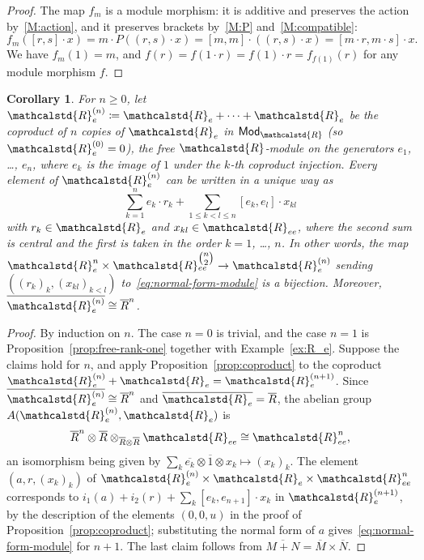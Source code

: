\documentclass[reqno,a4paper]{amsart}
\renewcommand{\binom}{\tbinom} %
\theoremstyle{plain}
\newtheorem{corollary}[subsection]{Corollary}
\theoremstyle{definition}
\newcommand{\DefEq}{\coloneq}
\newcommand{\R}{\ensuremath{\mathcalstd{R}}}
\newcommand{\Mod}{\ensuremath{\mathsf{Mod}}}
\renewcommand{\Re}{\ensuremath{\R_{e}}}
\newcommand{\Ree}{\ensuremath{\R_{ee}}}
\newcommand{\Rbar}{\ensuremath{\overline{R}}}
\newcommand{\brk}[2]{\ensuremath{[#1,#2]}}
\begin{document}
\begin{proof}
  The map \(f_{m}\) is a module morphism: it is additive and preserves the action by~\ref{M:action}, and it preserves brackets by~\ref{M:P} and~\ref{M:compatible}:
  \[
    f_{m}(\brk{r}{s}\cdot x)=m\cdot P((r,s)\cdot x)=\brk{m}{m}\cdot((r,s)\cdot x)=\brk{m\cdot r}{m\cdot s}\cdot x\text{.}
  \]
  We have \(f_{m}(1)=m\), and \(f(r)=f(1\cdot r)=f(1)\cdot r=f_{f(1)}(r)\) for any module morphism \(f\).
\end{proof}

\begin{corollary}\label{cor:free-modules}
  For \(n\geq 0\), let \(\Re^{(n)}\DefEq\Re+\cdots+\Re\) be the coproduct of \(n\) copies of \(\Re\) in \(\Mod_{\R}\) (so \(\Re^{(0)}=0\)), the free \(\R\)-module on the generators \(e_{1}\), \dots, \(e_{n}\), where \(e_{k}\) is the image of \(1\) under the \(k\)-th coproduct injection. Every element of \(\Re^{(n)}\) can be written in a unique way as
  \begin{equation}\label{eq:normal-form-module}
    \sum_{k=1}^{n}e_{k}\cdot r_{k}+\sum_{1\leq k<l\leq n}\brk{e_{k}}{e_{l}}\cdot x_{kl}
  \end{equation}
  with \(r_{k}\in\Re\) and \(x_{kl}\in\Ree\), where the second sum is central and the first is taken in the order \(k=1\), \dots, \(n\). In other words, the map \(\Re^{n}\times\Ree^{\binom{n}{2}}\to\Re^{(n)}\) sending \(((r_{k})_{k},(x_{kl})_{k<l})\) to~\eqref{eq:normal-form-module} is a bijection. Moreover, \(\overline{\Re^{(n)}}\cong\Rbar^{n}\).
\end{corollary}

\begin{proof}
  By induction on \(n\). The case \(n=0\) is trivial, and the case \(n=1\) is Proposition~\ref{prop:free-rank-one} together with Example~\ref{ex:R_e}. Suppose the claims hold for \(n\), and apply Proposition~\ref{prop:coproduct} to the coproduct \(\Re^{(n)}+\Re=\Re^{(n+1)}\). Since \(\overline{\Re^{(n)}}\cong\Rbar^{n}\) and \(\overline{\Re}=\Rbar\), the abelian group \(A(\Re^{(n)},\Re)\) is
  \[
    \Rbar^{n}\otimes\Rbar\otimes_{\Rbar\otimes\Rbar}\Ree\cong\Ree^{n}\text{,}
  \]
  an isomorphism being given by \(\sum_{k}\overline{e_{k}}\otimes\overline{1}\otimes x_{k}\mapsto(x_{k})_{k}\). The element \((a,r,(x_{k})_{k})\) of \(\Re^{(n)}\times\Re\times\Ree^{n}\) corresponds to \(i_{1}(a)+i_{2}(r)+\sum_{k}\brk{e_{k}}{e_{n+1}}\cdot x_{k}\) in \(\Re^{(n+1)}\), by the description of the elements \((0,0,u)\) in the proof of Proposition~\ref{prop:coproduct}; substituting the normal form of \(a\) gives~\eqref{eq:normal-form-module} for \(n+1\). The last claim follows from \(\overline{M+N}=\overline{M}\times\overline{N}\).
\end{proof}
\end{document}
